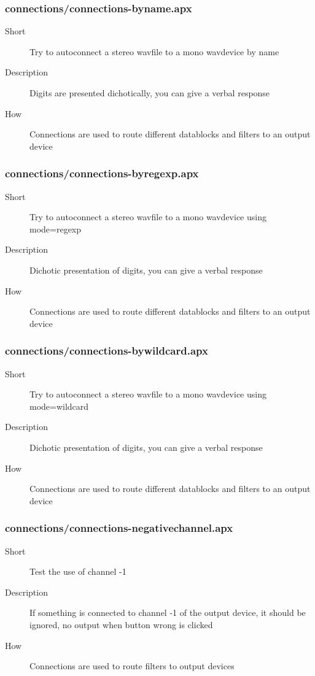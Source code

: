 \subsubsection{connections/connections-byname.apx}
\begin{description}
\item[Short] 
 Try to autoconnect a stereo wavfile to a mono wavdevice by name
\item[Description] 
 Digits are presented dichotically, you can give a verbal response
\item[How] 
 Connections are used to route different datablocks and filters to an output device
\end{description}

\subsubsection{connections/connections-byregexp.apx}
\begin{description}
\item[Short] 
 Try to autoconnect a stereo wavfile to a mono wavdevice using mode=regexp
\item[Description] 
 Dichotic presentation of digits, you can give a verbal response
\item[How] 
 Connections are used to route different datablocks and filters to an output device
\end{description}

\subsubsection{connections/connections-bywildcard.apx}
\begin{description}
\item[Short] 
 Try to autoconnect a stereo wavfile to a mono wavdevice using mode=wildcard
\item[Description] 
 Dichotic presentation of digits, you can give a verbal response
\item[How] 
 Connections are used to route different datablocks and filters to an output device
\end{description}

\subsubsection{connections/connections-negativechannel.apx}
\begin{description}
\item[Short] 
 Test the use of channel -1
\item[Description] 
 If something is connected to channel -1 of the output device, it should be ignored, no output when button wrong is clicked
\item[How] 
 Connections are used to route filters to output devices
\end{description}

